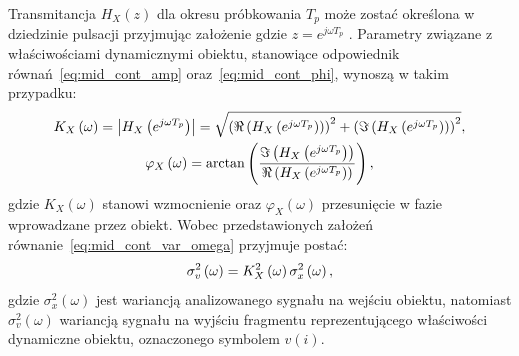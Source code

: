 Transmitancja $H_{X}(z)$ dla okresu próbkowania $T_{p}$ może zostać określona w dziedzinie pulsacji przyjmując założenie gdzie $z = e^{j\omega T_{p}}$ \cite{proakis_dsp}. Parametry związane z właściwościami dynamicznymi obiektu, stanowiące odpowiednik równań~\eqref{eq:mid_cont_amp} oraz~\eqref{eq:mid_cont_phi}, wynoszą w takim przypadku:
\begin{gather}
K_{X} \left(\omega\right) = \left| H_{X} \left(e^{j\omega T_{p}}\right) \right| = \sqrt{\left( \Re \left( H_{X} \left(e^{j\omega T_{p}}\right) \right) \right)^{2} + \left( \Im \left( H_{X} \left(e^{j\omega T_{p}}\right) \right) \right)^{2}} \label{eq:mid_disc_amp}, \\
\varphi_{X} \left(\omega\right) = \arctan \left( \frac{\Im \left( H_{X} \left(e^{j\omega T_{p}}\right) \right)}{\Re \left( H_{X} \left(e^{j\omega T_{p}}\right) \right)} \right) \label{eq:mid_disc_phi},
\end{gather}
gdzie $K_{X}(\omega)$ stanowi wzmocnienie oraz $\varphi_{X}(\omega)$ przesunięcie w fazie wprowadzane przez obiekt. Wobec przedstawionych założeń równanie~\eqref{eq:mid_cont_var_omega} przyjmuje postać:
\begin{equation}
\sigma_{v}^{2} \left(\omega\right) = K_{X}^{2} \left(\omega\right) \sigma_{x}^{2} \left(\omega\right) \label{eq:mid_disc_var_omega},
\end{equation}
gdzie $\sigma_{x}^{2}(\omega)$ jest wariancją analizowanego sygnału na wejściu obiektu, natomiast $\sigma_{v}^{2}(\omega)$ wariancją sygnału na wyjściu fragmentu reprezentującego właściwości dynamiczne obiektu, oznaczonego symbolem $v(i)$.


